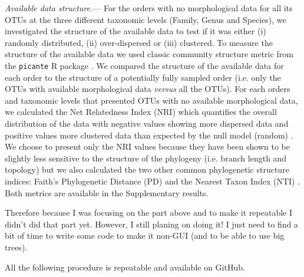 \documentclass[12pt,letterpaper]{article}
\renewcommand{\subsubsection}[1]{%
\vspace{2ex}
\noindent
\textit{#1.}---}
\begin{document}
\subsubsection{Available data structure}
For the orders with no morphological data for all its OTUs at the three different taxonomic levels (Family, Genus and Species), we investigated the structure of the available data to test if it was either (i) randomly distributed, (ii) over-dispersed or (iii) clustered.
To measure the structure of the available data we used classic community structure metric from the \texttt{picante} R package \citep{picante}.
We compared the structure of the available data for each order to the structure of a potentially fully sampled order (i.e.
only the OTUs with available morphological data \textit{versus} all the OTUs).
For each orders and taxonomic levels that presented OTUs with no available morphological data, we calculated the Net Relatedness Index (NRI) which quantifies the overall distribution of the data with negative values showing more dispersed data and positive values more clustered data than expected by the null model (random) \citep{webb2002phylogenies}.
We choose to present only the NRI values because they have been shown to be slightly less sensitive to the structure of the phylogeny (i.e.
branch length and topology) \citep{NRI,journal.pone.0004390} but we also calculated the two other common phylogenetic structure indices: Faith's Phylogenetic Distance (PD) \citep{Faith19921} and the Nearest Taxon Index (NTI) \citep{webb2002phylogenies}.
Both metrics are available in the Supplementary results.

Therefore because I was focusing on the part above and to make it repeatable I didn't did that part yet.
However, I still planing on doing it! I just need to find a bit of time to write some code to make it non-GUI (and to be able to use big trees).

All the following procedure is repeatable and available on GitHub.

%
%
\end{document}
